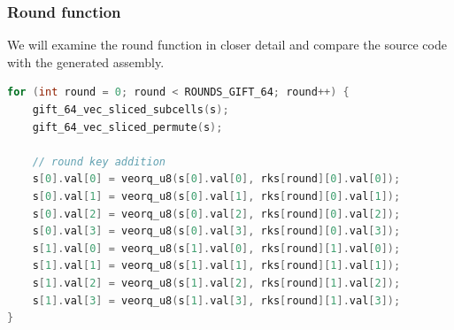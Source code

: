 \subsubsection{Round function}
We will examine the round function in closer detail and compare the source code
with the generated assembly.




\begin{lstlisting}[language=c, caption={Round function}]
for (int round = 0; round < ROUNDS_GIFT_64; round++) {
    gift_64_vec_sliced_subcells(s);
    gift_64_vec_sliced_permute(s);

    // round key addition
    s[0].val[0] = veorq_u8(s[0].val[0], rks[round][0].val[0]);
    s[0].val[1] = veorq_u8(s[0].val[1], rks[round][0].val[1]);
    s[0].val[2] = veorq_u8(s[0].val[2], rks[round][0].val[2]);
    s[0].val[3] = veorq_u8(s[0].val[3], rks[round][0].val[3]);
    s[1].val[0] = veorq_u8(s[1].val[0], rks[round][1].val[0]);
    s[1].val[1] = veorq_u8(s[1].val[1], rks[round][1].val[1]);
    s[1].val[2] = veorq_u8(s[1].val[2], rks[round][1].val[2]);
    s[1].val[3] = veorq_u8(s[1].val[3], rks[round][1].val[3]);
}
\end{lstlisting}

